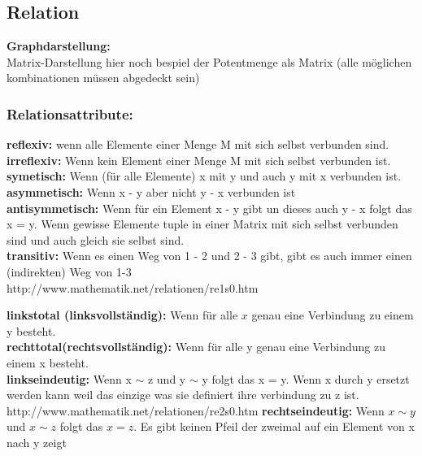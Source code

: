 \subsection{Relation}
\textbf{Graphdarstellung:} \\

Matrix-Darstellung hier noch bespiel der Potentmenge als Matrix (alle möglichen kombinationen müssen abgedeckt sein)\\


\subsubsection{Relationsattribute:}

\textbf{reflexiv:} wenn alle Elemente einer Menge M mit sich selbst verbunden sind.\\

\textbf{irreflexiv:} Wenn kein Element einer Menge M mit sich selbst verbunden ist.\\

\textbf{symetisch:} Wenn (für alle Elemente) x mit y und auch y mit x verbunden ist.\\

\textbf{asymmetisch:} Wenn x - y aber nicht y - x verbunden ist\\

\textbf{antisymmetisch:} Wenn für ein Element x - y gibt un dieses auch y - x folgt das x = y. Wenn gewisse Elemente tuple in einer Matrix mit sich selbst verbunden sind und auch gleich sie selbst sind.\\

\textbf{transitiv:} Wenn es einen Weg von 1 - 2 und 2 - 3 gibt, gibt es auch immer einen (indirekten) Weg von 1-3\\
 
http://www.mathematik.net/relationen/re1s0.htm
 
 
\textbf{linkstotal (linksvollständig):} Wenn für alle $x$ genau eine Verbindung zu einem y besteht.\\

\textbf{rechttotal(rechtsvollständig):} Wenn für alle y genau eine Verbindung zu einem x besteht.\\

\textbf{linkseindeutig:} Wenn x $\sim$ z und y $\sim$ y folgt das x = y. Wenn x durch y ersetzt werden kann weil das einzige was sie definiert ihre verbindung zu z ist.\\


http://www.mathematik.net/relationen/re2s0.htm
\textbf{rechtseindeutig:} 
Wenn $x \sim y$ und $x \sim z$ folgt das $x = z$. Es gibt keinen Pfeil der zweimal auf ein Element von x nach y zeigt

